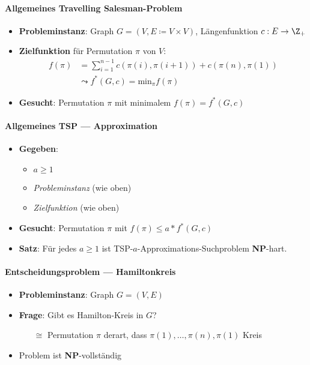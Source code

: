 \paragraph{Allgemeines Travelling Salesman-Problem}
\begin{itemize}
  \item \textbf{Probleminstanz}: Graph $ G = (V, E \coloneqq V \times V) $, Längenfunktion $ c: E \to \Z_+ $
  \item \textbf{Zielfunktion} für Permutation $ \pi $ von $ V $:
  \begin{align*}
    f(\pi) &= \textstyle\sum_{i=1}^{ n-1 }c(\pi(i), \pi(i+1)) + c(\pi(n),\pi(1)) \\
     &\leadsto f^*(G,c) = \text{min}_\pi f(\pi)
  \end{align*}
  \item \textbf{Gesucht}: Permutation $ \pi $ mit minimalem $ f(\pi) = f^*(G,c) $
\end{itemize}

\paragraph{Allgemeines TSP --- Approximation}
\begin{itemize}
  \item \textbf{Gegeben}:
  \begin{itemize}
    \item $ a \geq 1 $
    \item \emph{Probleminstanz} (wie oben)
    \item \emph{Zielfunktion} (wie oben)
  \end{itemize}
  \item \textbf{Gesucht}: Permutation $ \pi $ mit $ f(\pi) \leq a*f^*(G,c) $
  \item \textbf{Satz}: Für jedes $ a \geq 1 $ ist TSP-$ a $-Approximations-Suchproblem \textbf{NP}-hart.
\end{itemize}

\paragraph{Entscheidungsproblem --- Hamiltonkreis}
\begin{itemize}
  \item \textbf{Probleminstanz}: Graph $ G = (V,E) $
  \item \textbf{Frage}: Gibt es Hamilton-Kreis in $ G $?
  \begin{itemize}
    \item[$ \cong $] Permutation $ \pi $ derart, dass $ \pi(1), \dots,\pi(n),\pi(1) $ Kreis
  \end{itemize}
  \item Problem ist \textbf{NP}-vollständig
\end{itemize}

